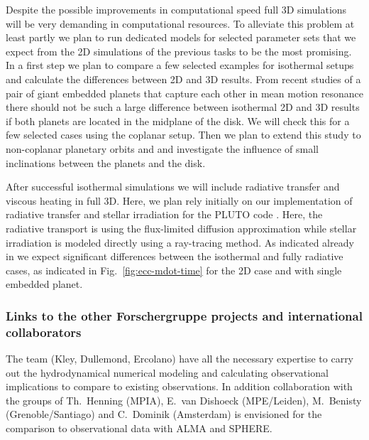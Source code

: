 \documentclass[10pt,fleqn,twoside]{article}
\begin{document}
\begin{description}
Despite the possible improvements in computational speed full 3D simulations will be very
demanding in computational resources. To alleviate this problem at least partly we plan to run
dedicated models for selected parameter sets that we expect from the 2D simulations of the previous
tasks to be the most promising. In a first step we plan to compare a few selected examples for
isothermal setups and calculate the differences between 2D and 3D results.
From recent studies of a pair of giant embedded planets that capture each other
in mean motion resonance there should not be such a large difference between isothermal 2D and 3D results
\citep{2016MNRAS.461.4406A} if both planets are located in the midplane of the disk. 
We will check this for a few selected cases using the coplanar setup.
Then we plan to extend this study to non-coplanar planetary orbits and
and investigate the influence of small inclinations between the planets and the disk.

After successful isothermal simulations we will include radiative transfer and viscous heating in full 3D.
Here, we plan rely initially on our implementation of radiative transfer and stellar irradiation for the
PLUTO code \citep{2013A&A...559A..80K}. Here, the radiative transport is using the flux-limited diffusion
approximation while stellar irradiation is modeled directly using a ray-tracing method.
As indicated already in \citet{2013A&A...560A..40M} we expect significant differences between the 
isothermal and fully radiative cases, as indicated in Fig.~\ref{fig:ecc-mdot-time} for the 2D case and
with single embedded planet.

\end{description}


\subsubsection{Links to the other Forschergruppe projects and international collaborators}
The team (Kley, Dullemond, Ercolano) have all the necessary expertise
to carry out the hydrodynamical numerical modeling and calculating observational implications
to compare to existing observations. 
In addition
collaboration with the groups of Th.~Henning (MPIA), E.~van Dishoeck
(MPE/Leiden), M.~Benisty (Grenoble/Santiago) and C.~Dominik (Amsterdam) is
envisioned for the comparison to observational data with ALMA and SPHERE.
\end{document}
